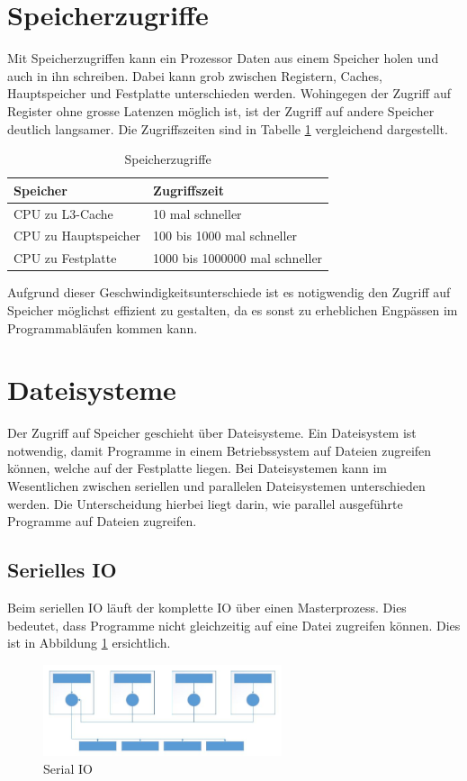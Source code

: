 \section{Speicherzugriffe}
Mit Speicherzugriffen kann ein Prozessor Daten aus einem Speicher holen und auch in ihn schreiben. Dabei kann grob zwischen Registern, Caches, Hauptspeicher und Festplatte unterschieden werden. Wohingegen der Zugriff auf Register ohne grosse Latenzen m\"oglich ist, ist der Zugriff auf andere Speicher deutlich langsamer. Die Zugriffszeiten sind in Tabelle \ref{tab:Speicher} vergleichend dargestellt.
\begin{table}[h]
	\centering
	\begin{tabular}{l|l}
		\textbf{Speicher} & \textbf{Zugriffszeit} \\
		\hline
		CPU zu L3-Cache & 10 mal schneller \\
		\hline
		CPU zu Hauptspeicher & 100 bis 1000 mal schneller \\
		\hline
		CPU zu Festplatte & 1000 bis 1000000 mal schneller \\
	\end{tabular}
	\caption{Speicherzugriffe}
	\label{tab:Speicher}
\end{table}

Aufgrund dieser Geschwindigkeitsunterschiede ist es notigwendig den Zugriff auf Speicher m\"oglichst effizient zu gestalten, da es sonst zu erheblichen Engp\"assen im Programmabl\"aufen kommen kann.

\section{Dateisysteme}
Der Zugriff auf Speicher geschieht \"uber Dateisysteme. Ein Dateisystem ist notwendig, damit Programme in einem Betriebssystem auf Dateien zugreifen k\"onnen, welche auf der Festplatte liegen.
Bei Dateisystemen kann im Wesentlichen zwischen seriellen und parallelen Dateisystemen unterschieden werden. Die Unterscheidung hierbei liegt darin, wie parallel ausgef\"uhrte Programme auf Dateien zugreifen.
\subsection{Serielles IO}
Beim seriellen IO l\"auft der komplette IO \"uber einen Masterprozess. Dies bedeutet, dass Programme nicht gleichzeitig auf eine Datei zugreifen k\"onnen. Dies ist in Abbildung \ref{fig:serial} ersichtlich.
\begin{figure}[h]
	\centering
	\includegraphics[width=7cm]{fig/SerialIO.jpg}
	\caption{Serial IO \cite{Cazes.26.09.2013}}
	\label{fig:serial}
\end{figure}

